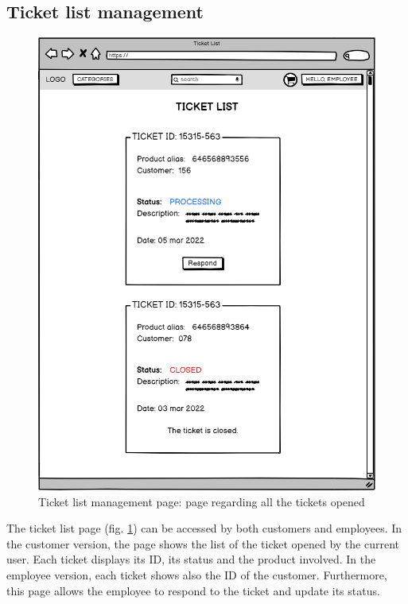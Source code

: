 \subsection{Ticket list management}
    \begin{figure}[H]
        \centering
        \includegraphics[width=\textwidth,height=0.7\textheight,keepaspectratio]{mockups/ticketPageMockup.png}
            \caption{Ticket list management page: page regarding all the tickets opened}
            \label{fig:TicketPage}
    \end{figure}
The ticket list page (fig. \ref{fig:TicketPage}) can be accessed by both customers and employees. In the customer version, the page shows the list of the ticket opened by the current user. Each ticket displays its ID, its status and the product involved. In the employee version, each ticket shows also the ID of the customer. Furthermore, this page allows the employee to respond to the ticket and update its status.


